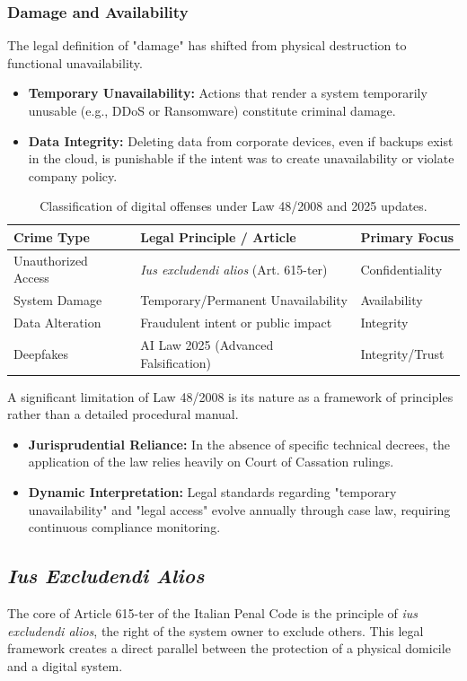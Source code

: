 \subsubsection*{Damage and Availability}
The legal definition of "damage" has shifted from physical destruction to functional unavailability.
\begin{itemize}
    \item \textbf{Temporary Unavailability:} Actions that render a system temporarily unusable (e.g., DDoS or Ransomware) constitute criminal damage.
    \item \textbf{Data Integrity:} Deleting data from corporate devices, even if backups exist in the cloud, is punishable if the intent was to create unavailability or violate company policy.
\end{itemize}

\begin{table}[H]
\centering
\small
\begin{tabular}{|p{3cm}|p{5cm}|p{2.5cm}|}
\hline
\textbf{Crime Type} & \textbf{Legal Principle / Article} & \textbf{Primary Focus} \\
\hline
Unauthorized Access & \textit{Ius excludendi alios} (Art. 615-ter) & Confidentiality \\
System Damage & Temporary/Permanent Unavailability & Availability \\
Data Alteration & Fraudulent intent or public impact & Integrity \\
Deepfakes & AI Law 2025 (Advanced Falsification) & Integrity/Trust \\
\hline
\end{tabular}
\caption{Classification of digital offenses under Law 48/2008 and 2025 updates.}
\end{table}

\noindent
A significant limitation of Law 48/2008 is its nature as a framework of principles rather than a detailed procedural manual.
\begin{itemize}
    \item \textbf{Jurisprudential Reliance:} In the absence of specific technical decrees, the application of the law relies heavily on Court of Cassation rulings.
    \item \textbf{Dynamic Interpretation:} Legal standards regarding "temporary unavailability" and "legal access" evolve annually through case law, requiring continuous compliance monitoring.
\end{itemize}


\subsection{ \textit{Ius Excludendi Alios}}
The core of Article 615-ter of the Italian Penal Code is the principle of \textit{ius excludendi alios}, the right of the system owner to exclude others. This legal framework creates a direct parallel between the protection of a physical domicile and a digital system.

